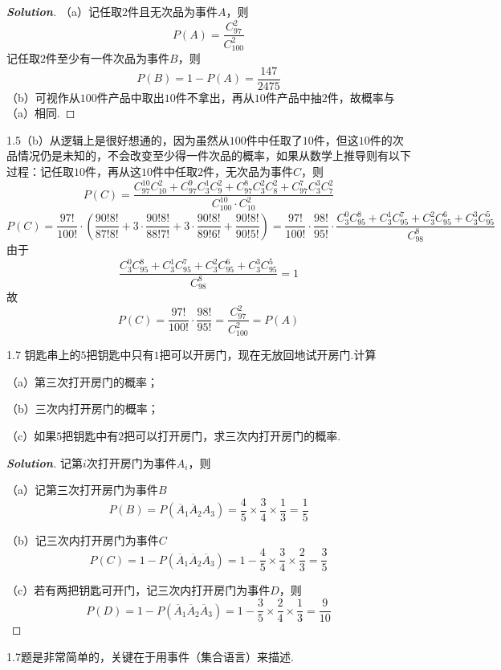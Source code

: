 \documentclass[10pt, a4paper, oneside]{ctexart}
\newenvironment{solution}{\begin{proof}[\bf Solution]}{\end{proof}}
\begin{document}
\begin{solution}
（a）记任取$2$件且无次品为事件$A$，则
\[P(A) = \frac{{C_{97}^2}}{{C_{100}^2}} \]
记任取$2$件至少有一件次品为事件$B$，则
\[
P(B)=1-P(A)=\frac{147}{2475}
\]
（b）可视作从$100$件产品中取出$10$件不拿出，再从$10$件产品中抽$2$件，故概率与（a）相同.
\end{solution}
\begin{remark}
1.5（b）从逻辑上是很好想通的，因为虽然从$100$件中任取了$10$件，但这$10$件的次品情况仍是未知的，不会改变至少得一件次品的概率，如果从数学上推导则有以下过程：记任取$10$件，再从这$10$件中任取$2$件，无次品为事件$C$，则
\[P(C) = \frac{{C_{97}^{10}C_{10}^2 + C_{97}^9C_3^1C_9^2 + C_{97}^8C_3^2C_8^2 + C_{97}^7C_3^3C_7^2}}{{C_{100}^{10} \cdot C_{10}^2}}\]
\[P(C) = \frac{{97!}}{{100!}} \cdot \left( {\frac{{90!8!}}{{87!8!}} + 3 \cdot \frac{{90!8!}}{{88!7!}} + 3 \cdot \frac{{90!8!}}{{89!6!}} + \frac{{90!8!}}{{90!5!}}} \right) = \frac{{97!}}{{100!}} \cdot \frac{{98!}}{{95!}} \cdot \frac{{C_3^0C_{95}^8 + C_3^1C_{95}^7 + C_3^2C_{95}^6 + C_3^3C_{95}^5}}{{C_{98}^8}}\]
由于
\[\frac{{C_3^0C_{95}^8 + C_3^1C_{95}^7 + C_3^2C_{95}^6 + C_3^3C_{95}^5}}{{C_{98}^8}} = 1\]
故
\[P(C) = \frac{{97!}}{{100!}} \cdot \frac{{98!}}{{95!}} = \frac{{C_{97}^2}}{{C_{100}^2}}=P(A)\]
\end{remark}

1.7 钥匙串上的$5$把钥匙中只有$1$把可以开房门，现在无放回地试开房门.计算

（a）第三次打开房门的概率；

（b）三次内打开房门的概率；

（c）如果$5$把钥匙中有$2$把可以打开房门，求三次内打开房门的概率.

\begin{solution}
记第$i$次打开房门为事件$A_i$，则

（a）记第三次打开房门为事件$B$
\[P(B)=P({\overline A _1}{\overline A _2}{A_3}) = \frac{4}{5} \times \frac{3}{4} \times \frac{1}{3} = \frac{1}{5}\]

（b）记三次内打开房门为事件$C$
\[P(C) = 1 - P({\overline A _1}{\overline A _2}{\overline A _3}) = 1 - \frac{4}{5} \times \frac{3}{4} \times \frac{2}{3} = \frac{3}{5}\]

（c）若有两把钥匙可开门，记三次内打开房门为事件$D$，则
\[P(D) = 1 - P({\overline A _1}{\overline A _2}{\overline A _3}) = 1 - \frac{3}{5} \times \frac{2}{4} \times \frac{1}{3} = \frac{9}{{10}}\]
\end{solution}
\begin{remark}
1.7题是非常简单的，关键在于用事件（集合语言）来描述.
\end{remark}
\end{document}

